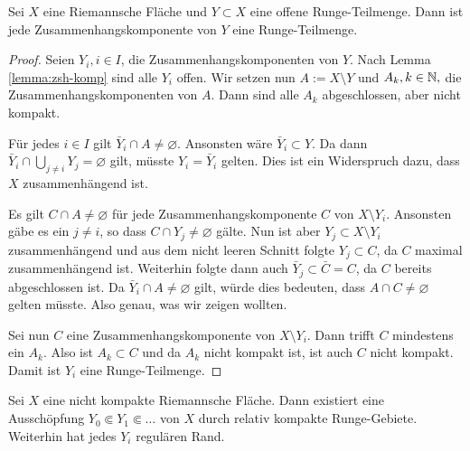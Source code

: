 \begin{thm}
  \label{thm:runge-zshkomp}
  Sei $X$ eine Riemannsche Fläche und $Y \subset X$ eine offene
  Runge-Teilmenge. Dann ist jede Zusammenhangskomponente von $Y$ eine
  Runge-Teilmenge. 
\end{thm}

\begin{proof}
  Seien $Y_i, i \in I$, die Zusammenhangskomponenten von
  $Y$. Nach Lemma \ref{lemma:zsh-komp} sind alle $Y_i$ offen.
  Wir setzen nun $A := X \setminus Y$ und $A_k, k\in \mathbb{N},$ die
  Zusammenhangskomponenten von $A$. Dann sind alle $A_k$
  abgeschlossen, aber nicht kompakt.
  
  Für jedes $i \in I$ gilt $\bar Y_i \cap A \neq
  \varnothing$. 
  Ansonsten wäre $\bar Y_i \subset Y$. Da dann $\bar Y_i \cap \bigcup_{j
    \neq i} Y_j = \varnothing$ gilt, müsste $Y_i = \bar Y_i$ gelten. Dies
  ist ein Widerspruch dazu, dass $X$ zusammenhängend ist.
  
  Es gilt $C \cap A \neq \varnothing$ für jede
  Zusammenhangskomponente $C$ von $X \setminus Y_i$. 
  Ansonsten gäbe es ein $j \neq i$, so dass $C \cap Y_j \neq
  \varnothing$ gälte.
  Nun ist aber $Y_j \subset X \setminus Y_i$ zusammenhängend und aus
  dem nicht leeren Schnitt folgte $Y_j \subset C$, da $C$ maximal
  zusammenhängend ist. Weiterhin folgte dann auch $\bar Y_j \subset
  \bar C = C$, da $C$ bereits abgeschlossen ist. Da $\bar Y_i \cap A
  \neq \varnothing$ gilt,  würde dies
  bedeuten, dass $A \cap C \neq \varnothing$ gelten müsste. Also
  genau, was wir zeigen wollten.
  
  Sei nun $C$ eine Zusammenhangskomponente von $X \setminus
  Y_i$. Dann trifft $C$ mindestens ein $A_k$. Also ist $A_k
  \subset C$ und da $A_k$ nicht kompakt ist, ist auch $C$ nicht kompakt.
  Damit ist $Y_i$ eine Runge-Teilmenge.
\end{proof}

\begin{thm}
  \label{thm:Ausschöpfung-Runge}
  Sei $X$ eine nicht kompakte Riemannsche Fläche. Dann existiert eine
  Ausschöpfung $Y_0 \Subset Y_1 \Subset \dots$ von $X$ durch relativ
  kompakte Runge-Gebiete. Weiterhin hat jedes $Y_i$ regulären Rand.
\end{thm}

